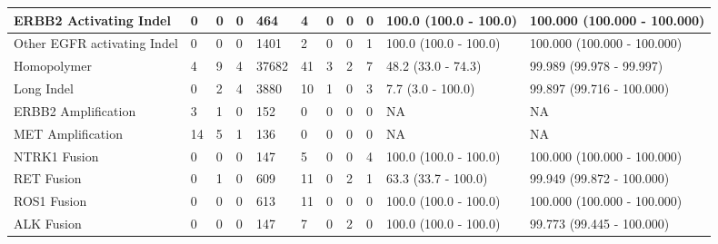 \begin{tabular}{|l|l|l|l|l|l|l|l|l|l|l|}
ERBB2 Activating Indel      &      0 &      0 &      0 &    464 &      4 &      0 &      0 &      0 &  100.0 (100.0 - 100.0) &  100.000 (100.000 - 100.000) \\ \hline
Other EGFR activating Indel &      0 &      0 &      0 &   1401 &      2 &      0 &      0 &      1 &  100.0 (100.0 - 100.0) &  100.000 (100.000 - 100.000) \\ \hline
Homopolymer                 &      4 &      9 &      4 &  37682 &     41 &      3 &      2 &      7 &     48.2 (33.0 - 74.3) &     99.989 (99.978 - 99.997) \\ \hline
Long Indel                  &      0 &      2 &      4 &   3880 &     10 &      1 &      0 &      3 &      7.7 (3.0 - 100.0) &    99.897 (99.716 - 100.000) \\ \hline
ERBB2 Amplification         &      3 &      1 &      0 &    152 &      0 &      0 &      0 &      0 &                     NA &                           NA \\ \hline
MET Amplification           &     14 &      5 &      1 &    136 &      0 &      0 &      0 &      0 &                     NA &                           NA \\ \hline
NTRK1 Fusion                &      0 &      0 &      0 &    147 &      5 &      0 &      0 &      4 &  100.0 (100.0 - 100.0) &  100.000 (100.000 - 100.000) \\ \hline
RET Fusion                  &      0 &      1 &      0 &    609 &     11 &      0 &      2 &      1 &    63.3 (33.7 - 100.0) &    99.949 (99.872 - 100.000) \\ \hline
ROS1 Fusion                 &      0 &      0 &      0 &    613 &     11 &      0 &      0 &      0 &  100.0 (100.0 - 100.0) &  100.000 (100.000 - 100.000) \\ \hline
ALK Fusion                  &      0 &      0 &      0 &    147 &      7 &      0 &      2 &      0 &  100.0 (100.0 - 100.0) &    99.773 (99.445 - 100.000) \\ \hline
\end{tabular}